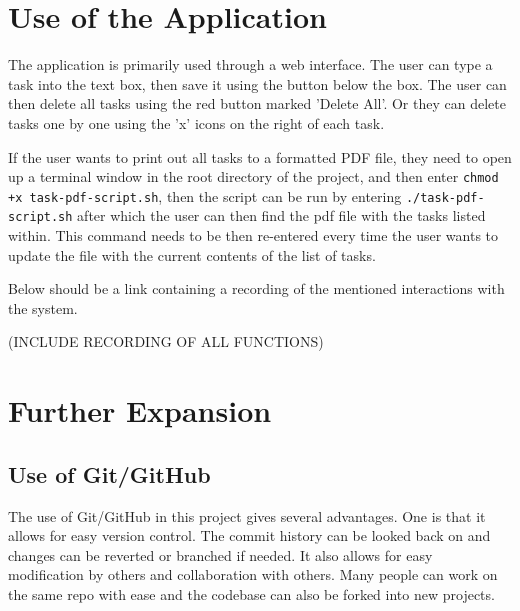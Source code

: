 \documentclass[12pt]{extarticle}
\begin{document}
\section{Use of the Application}
The application is primarily used through a web interface. The user can type a task into the text box, then save it using the button below the box. The user can then delete all tasks using the red button marked 'Delete All'. Or they can delete tasks one by one using the 'x' icons on the right of each task.

If the user wants to print out all tasks to a formatted PDF file, they need to open up a terminal window in the root directory of the project, and then enter  \lstinline|chmod +x task-pdf-script.sh|, then the script can be run by entering \lstinline|./task-pdf-script.sh| after which the user can then find the pdf file with the tasks listed within. This command needs to be then re-entered every time the user wants to update the file with the current contents of the list of tasks.

Below should be a link containing a recording of the mentioned interactions with the system. 

(INCLUDE RECORDING OF ALL FUNCTIONS)

\section{Further Expansion}
\subsection{Use of Git/GitHub}
The use of Git/GitHub in this project gives several advantages. One is that it allows for easy version control. The commit history can be looked back on and changes can be reverted or branched if needed. It also allows for easy modification by others and collaboration with others. Many people can work on the same repo with ease and the codebase can also be forked into new projects. 
\end{document}
